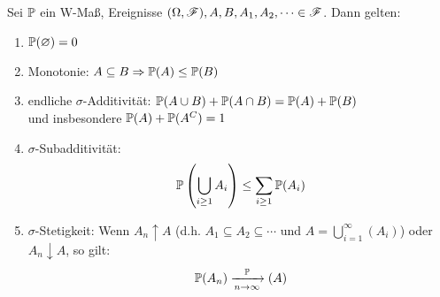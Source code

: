 \begin{proposition}
	Sei $\mathbb{P}$ ein W-Maß, Ereignisse $(\Omega, \mathscr{F}), A, B, A_1, A_2, \dots \in \mathscr{F}$. Dann gelten:
	\begin{enumerate}
		\item $\mathbb{P}(\varnothing) = 0$
		\item Monotonie: $A \subseteq B \Rightarrow \mathbb{P}(A) \le \mathbb{P}(B)$
		\item endliche $\sigma$-Additivität: $\mathbb{P}(A\cup B) + \mathbb{P}(A\cap B) = \mathbb{P}(A) + \mathbb{P}(B)$\\
und insbesondere $\mathbb{P}(A) + \mathbb{P}(A^C) = 1$
		\item $\sigma$-Subadditivität:
		\begin{align}
			\mathbb{P}\left(\bigcup_{i \ge 1} A_i\right) \le \sum_{i \ge 1} \mathbb{P}(A_i)\notag
		\end{align}
		\item $\sigma$-Stetigkeit: Wenn $A_n \uparrow A$ (d.h. $A_1 \subseteq A_2 \subseteq \cdots$ und $A = \bigcup_{i=1}^{\infty} (A_i)$) oder $A_n \downarrow A$, so gilt:
		\begin{align*}
			\mathbb{P}(A_n) \xrightarrow[n \to \infty] {\mathbb{P}}(A)
		\end{align*}
	\end{enumerate}
\end{proposition}

